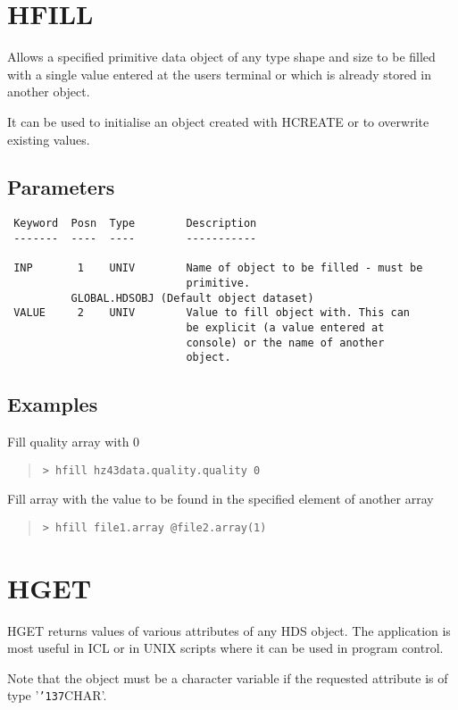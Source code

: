 \documentclass{book}
\renewcommand{\_}{{\tt\char'137}}     %
\begin{document}
\section{HFILL}
Allows a specified primitive data object of any type
shape and size to be filled with a single value entered at
the users terminal or which is already stored in another
object.

It can be used to initialise an object created with
HCREATE or to overwrite existing values.

\subsection{Parameters}
\begin{verbatim}
 Keyword  Posn  Type        Description
 -------  ----  ----        -----------

 INP       1    UNIV        Name of object to be filled - must be
                            primitive.
          GLOBAL.HDSOBJ (Default object dataset)
 VALUE     2    UNIV        Value to fill object with. This can
                            be explicit (a value entered at
                            console) or the name of another
                            object.

\end{verbatim}\subsection{Examples}
Fill quality array with 0
\begin{quote}\begin{verbatim}
> hfill hz43data.quality.quality 0
\end{verbatim}\end{quote}
Fill array with the value to be found in the specified
element of another array
\begin{quote}\begin{verbatim}
> hfill file1.array @file2.array(1)
\end{verbatim}\end{quote}
\section{HGET}
HGET returns values of various attributes of any HDS object. The
application is most useful in ICL or in UNIX scripts where it can
be used in program control.

Note that the object must be a character variable if the requested
attribute is of type '\_CHAR'.
\end{document}
